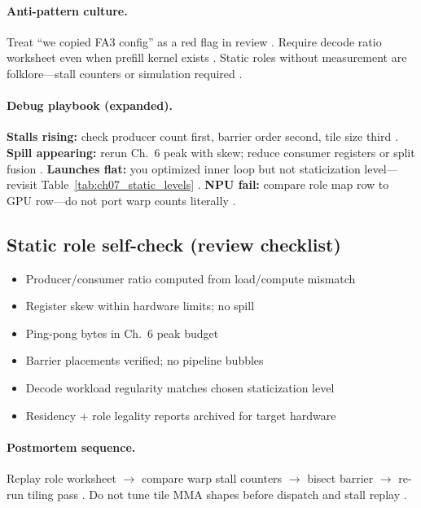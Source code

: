 \paragraph{Anti-pattern culture.}
Treat ``we copied FA3 config'' as a red flag in review \citep{shah2024flashattention3,patel2025llminference,taxbreak2026}.
Require decode ratio worksheet even when prefill kernel exists \citep{yirage2026,kwon2023vllm,memoryfloor2026}.
Static roles without measurement are folklore---stall counters or simulation required \citep{patel2025llminference,chen2020compilerbasedhardw,shah2024flashattention3}.

\paragraph{Debug playbook (expanded).}
\textbf{Stalls rising:} check producer count first, barrier order second, tile size third \citep{shah2024flashattention3,yirage2026,semianalysis2024tma}.
\textbf{Spill appearing:} rerun Ch.~6 peak with skew; reduce consumer registers or split fusion \citep{memoryfloor2026,dao2022flashattention,chen2020compilerbasedhardw}.
\textbf{Launches flat:} you optimized inner loop but not staticization level---revisit Table~\ref{tab:ch07_static_levels} \citep{taxbreak2026,nvidia2024cudagraphs,mpk2025}.
\textbf{NPU fail:} compare role map row to GPU row---do not port warp counts literally \citep{amd2024xdna,patel2025llminference,yirage2026}.

\subsection{Static role self-check (review checklist)}
\begin{itemize}
\item[$\square$] Producer/consumer ratio computed from load/compute mismatch
\item[$\square$] Register skew within hardware limits; no spill
\item[$\square$] Ping-pong bytes in Ch.~6 peak budget
\item[$\square$] Barrier placements verified; no pipeline bubbles
\item[$\square$] Decode workload regularity matches chosen staticization level
\item[$\square$] Residency + role legality reports archived for target hardware
\end{itemize}

\paragraph{Postmortem sequence.}
Replay role worksheet $\rightarrow$ compare warp stall counters $\rightarrow$ bisect barrier $\rightarrow$ re-run tiling pass \citep{shah2024flashattention3,yirage2026,taxbreak2026,memoryfloor2026}.
Do not tune tile MMA shapes before dispatch and stall replay \citep{patel2025llminference,nvidia2022hopper}.

